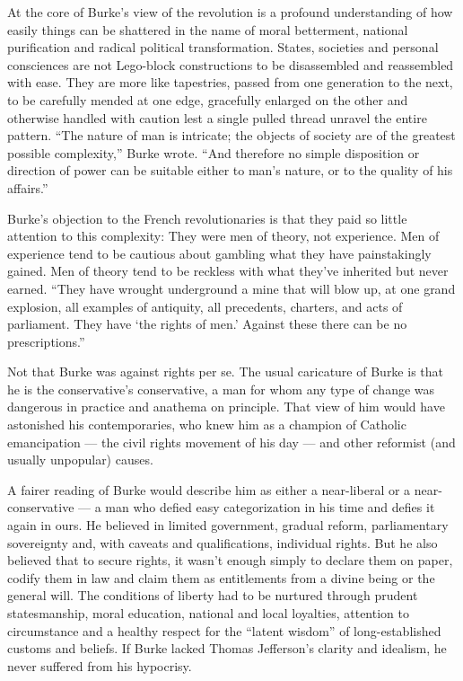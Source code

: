 At the core of Burke's view of the revolution is a profound
understanding of how easily things can be shattered in the name of moral
betterment, national purification and radical political transformation.
States, societies and personal consciences are not Lego-block
constructions to be disassembled and reassembled with ease. They are
more like tapestries, passed from one generation to the next, to be
carefully mended at one edge, gracefully enlarged on the other and
otherwise handled with caution lest a single pulled thread unravel the
entire pattern. ``The nature of man is intricate; the objects of society
are of the greatest possible complexity,'' Burke wrote. ``And therefore
no simple disposition or direction of power can be suitable either to
man's nature, or to the quality of his affairs.''

Burke's objection to the French revolutionaries is that they paid so
little attention to this complexity: They were men of theory, not
experience. Men of experience tend to be cautious about gambling what
they have painstakingly gained. Men of theory tend to be reckless with
what they've inherited but never earned. ``They have wrought underground
a mine that will blow up, at one grand explosion, all examples of
antiquity, all precedents, charters, and acts of parliament. They have
`the rights of men.' Against these there can be no prescriptions.''

Not that Burke was against rights per se. The usual caricature of Burke
is that he is the conservative's conservative, a man for whom any type
of change was dangerous in practice and anathema on principle. That view
of him would have astonished his contemporaries, who knew him as a
champion of Catholic emancipation --- the civil rights movement of his
day --- and other reformist (and usually unpopular) causes.

A fairer reading of Burke would describe him as either a near-liberal or
a near-conservative --- a man who defied easy categorization in his time
and defies it again in ours. He believed in limited government, gradual
reform, parliamentary sovereignty and, with caveats and qualifications,
individual rights. But he also believed that to secure rights, it wasn't
enough simply to declare them on paper, codify them in law and claim
them as entitlements from a divine being or the general will. The
conditions of liberty had to be nurtured through prudent statesmanship,
moral education, national and local loyalties, attention to circumstance
and a healthy respect for the ``latent wisdom'' of long-established
customs and beliefs. If Burke lacked Thomas Jefferson's clarity and
idealism, he never suffered from his hypocrisy.

